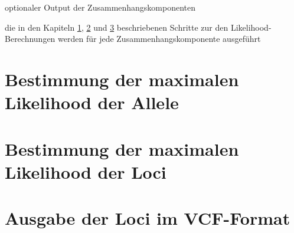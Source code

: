 optionaler Output der Zusammenhangskomponenten

die in den Kapiteln \ref{sec:lh_allele}, \ref{sec:lh_loci} und \ref{sec:vcf} beschriebenen Schritte zur den Likelihood-Berechnungen werden für jede Zusammenhangskomponente ausgeführt

\section{Bestimmung der maximalen Likelihood der Allele} \label{sec:lh_allele}
\subsection{} \label{subsec:}


\section{Bestimmung der maximalen Likelihood der Loci} \label{sec:lh_loci}
\subsection{} \label{subsec:}


\section{Ausgabe der Loci im VCF-Format} \label{sec:vcf}
\subsection{} \label{subsec:}

